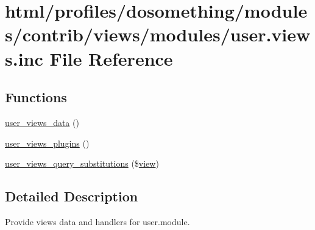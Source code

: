 \hypertarget{user_8views_8inc}{
\section{html/profiles/dosomething/modules/contrib/views/modules/user.views.inc File Reference}
\label{user_8views_8inc}
}
\subsection*{Functions}
\begin{DoxyCompactItemize}
\item 
\hyperlink{user_8views_8inc_a8de9e9f62db27dac6f5778d4362a7dc2}{user\_\-views\_\-data} ()
\item 
\hyperlink{user_8views_8inc_aa36ee99043e81c01d59f8f7c47d310d1}{user\_\-views\_\-plugins} ()
\item 
\hyperlink{user_8views_8inc_ae3007fb2a7423125b3458d4018293eba}{user\_\-views\_\-query\_\-substitutions} (\$\hyperlink{classview}{view})
\end{DoxyCompactItemize}


\subsection{Detailed Description}
Provide views data and handlers for user.module. 

